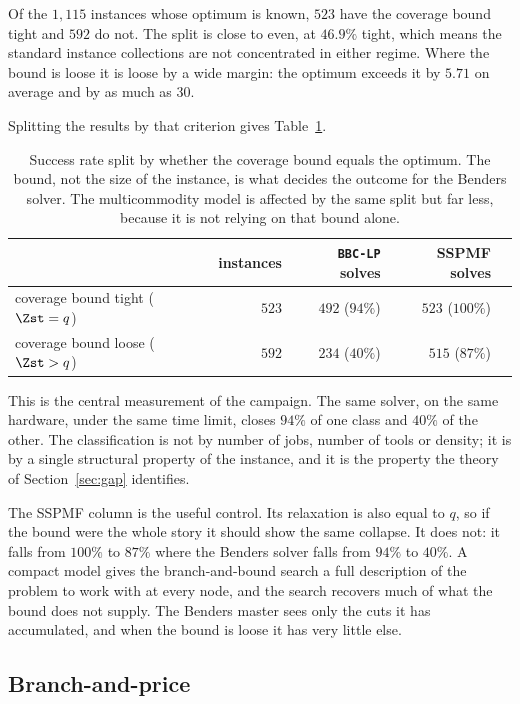 Of the $1{,}115$ instances whose optimum is known, $523$ have the coverage bound tight
and $592$ do not. The split is close to even, at $46.9\%$ tight, which means the
standard instance collections are not concentrated in either regime. Where the bound is
loose it is loose by a wide margin: the optimum exceeds it by $5.71$ on average and by
as much as $30$.

Splitting the results by that criterion gives Table~\ref{tab:tightness}.

\begin{table}[h]\centering
\footnotesize
\begin{tabular}{@{}lrrrr@{}}
\toprule
& instances & \texttt{BBC-LP} solves & SSPMF solves\\
\midrule
coverage bound tight ($\Zst=q$)  & $523$ & $492$ \; ($94\%$) & $523$ \; ($100\%$)\\
coverage bound loose ($\Zst>q$)  & $592$ & $234$ \; ($40\%$) & $515$ \; ($87\%$)\\
\bottomrule
\end{tabular}
\caption{Success rate split by whether the coverage bound equals the optimum. The
bound, not the size of the instance, is what decides the outcome for the Benders
solver. The multicommodity model is affected by the same split but far less, because
it is not relying on that bound alone.}
\label{tab:tightness}
\end{table}

This is the central measurement of the campaign. The same solver, on the same hardware,
under the same time limit, closes $94\%$ of one class and $40\%$ of the other. The
classification is not by number of jobs, number of tools or density; it is by a single
structural property of the instance, and it is the property the theory of
Section~\ref{sec:gap} identifies.

The SSPMF column is the useful control. Its relaxation is also equal to $q$, so if the
bound were the whole story it should show the same collapse. It does not: it falls from
$100\%$ to $87\%$ where the Benders solver falls from $94\%$ to $40\%$. A compact model
gives the branch-and-bound search a full description of the problem to work with at
every node, and the search recovers much of what the bound does not supply. The Benders
master sees only the cuts it has accumulated, and when the bound is loose it has very
little else.

\subsection{Branch-and-price}\label{ssec:results-bnp}

